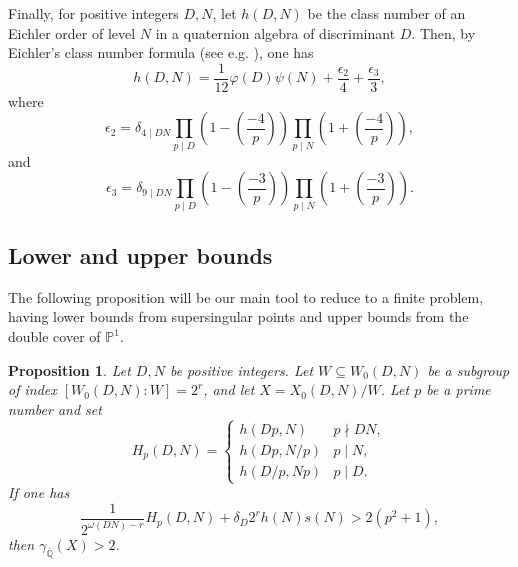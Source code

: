 \documentclass[12pt]{amsart}
\renewcommand{\P}{\mathbb{P}}
\newcommand{\Q}{\mathbb{Q}}
\newcommand{\Qbar}{{\overline{\Q}}}
\numberwithin{equation}{subsection}
\theoremstyle{plain}\newtheorem{ithm}{Theorem}
\theoremstyle{plain}\newtheorem{iprop}[ithm]{Proposition}
\newtheorem{proposition}[equation]{Proposition}
\theoremstyle{definition}
\theoremstyle{remark}
\newcommand{\Curve}[2]{X_0({#1},{#2})} %
\newcommand{\ALfull}[2]{W_0({#1},{#2})} %
\begin{document}
Finally, for positive integers $D,N$, let $h(D,N)$ be the class number of an Eichler order of level $N$ in a quaternion algebra of discriminant $D$. Then, by Eichler's class number formula (see e.g. \cite[Theorem 30.1.5]{JV}), one has
    \begin{equation} \label{eq: Eichler class number}
    h(D, N) = \frac{1}{12} \varphi(D) \psi(N) + \frac{\epsilon_2}{4} + \frac{\epsilon_3}{3},
    \end{equation} 
    where
    $$
    \epsilon_2 = \delta_{4 \mid DN} \prod_{p \mid D} \left(1 - \left(\frac{-4}{p} \right) \right)
    \prod_{p \mid N}  \left(1 + \left(\frac{-4}{p} \right) \right), 
    $$
    and
    $$
    \epsilon_3 = \delta_{9 \mid DN} \prod_{p \mid D} \left(1 - \left(\frac{-3}{p} \right) \right)
    \prod_{p \mid N}  \left(1 + \left(\frac{-3}{p} \right) \right). 
    $$

\subsection{Lower and upper bounds}

The following proposition will be our main tool to reduce to a finite problem, having lower bounds from supersingular points and upper bounds from the double cover of $\P^1$. 

\begin{proposition} \label{prop: finite bounds}
    Let $D, N$ be positive integers. Let $W \subseteq \ALfull{D}{N}$ be a subgroup of index $[\ALfull{D}{N} : W] = 2^r$, and let $X = \Curve{D}{N} / W$. 
    Let $p$ be a prime number and set
    $$
    H_p(D,N) = \begin{cases}
        h(Dp, N) & p \nmid DN, \\
        h(Dp, N/p) & p \mid N, \\
        h(D/p, Np) & p \mid D.
    \end{cases}
    $$
    If one has 
    \begin{equation} \label{eq: finite bounds}
    \frac{1}{2^{\omega(DN)-r}} H_p(D,N) + \delta_{D} 2^rh(N)s(N) > 2(p^2+1),
    \end{equation}
    then $\gamma_{\Qbar}(X) > 2$. 
\end{proposition}
\end{document}
